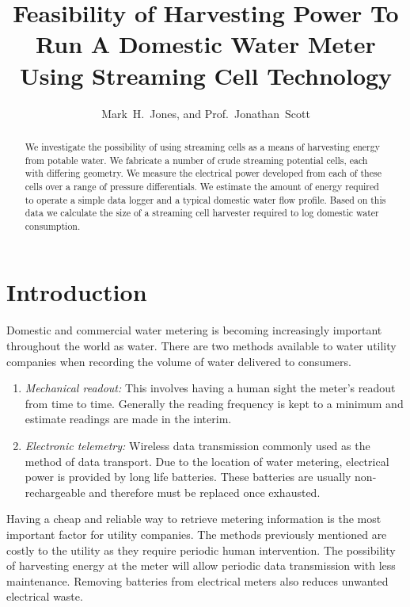 \documentclass[10pt,final,journal]{IEEEtran}
\title{Feasibility of Harvesting Power To Run A Domestic Water Meter Using Streaming Cell Technology}
\author{Mark~H.~Jones, and Prof.~Jonathan~Scott}
\begin{document}
    \maketitle

    \begin{abstract}
        We investigate the possibility of using streaming cells as a means of harvesting energy from potable water.
        We fabricate a number of crude streaming potential cells, each with differing geometry.
        We measure the electrical power developed from each of these cells over a range of pressure differentials.
        We estimate the amount of energy required to operate a simple data logger and a typical domestic water flow profile.
        Based on this data we calculate the size of a streaming cell harvester required to log domestic water consumption.
    \end{abstract}

    \section{Introduction}
    Domestic and commercial water metering is becoming increasingly important throughout the world as water.
    There are two methods available to water utility companies when recording the volume of water delivered to consumers.
    \begin{enumerate}
        \item \emph{Mechanical readout:}
            This involves having a human sight the meter's readout from time to time.
            Generally the reading frequency is kept to a minimum and estimate readings are made in the interim.
        \item \emph{Electronic telemetry:}
            Wireless data transmission commonly used as the method of data transport.
            Due to the location of water metering, electrical power is provided by long life batteries.
            These batteries are usually non-rechargeable and therefore must be replaced once exhausted.
        \end{enumerate}
    Having a cheap and reliable way to retrieve metering information is the most important factor for utility companies.
    The methods previously mentioned are costly to the utility as they require periodic human intervention.
    The possibility of harvesting energy at the meter will allow periodic data transmission with less maintenance.
    Removing batteries from electrical meters also reduces unwanted electrical waste.
\end{document}
